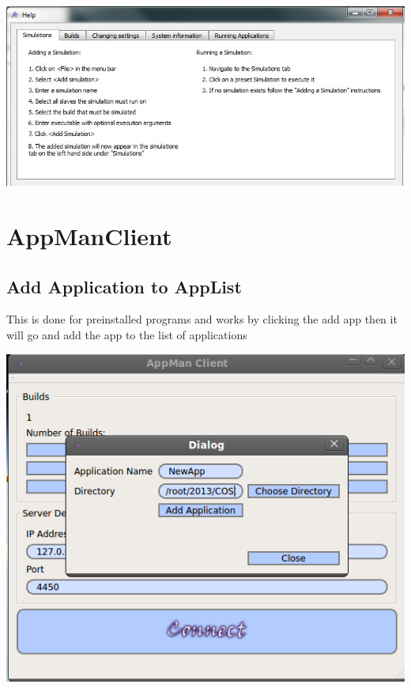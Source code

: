 \documentclass[a4paper,12pt,final]{article}
\begin{document}
\begin{center}
  	\includegraphics[scale=0.7]{AboutHelp.jpg}
 \end{center}

\newpage
\section{AppManClient}

\subsection{Add Application to AppList}
This is done for preinstalled programs and works by clicking the add app then it will go and add the app to the list of applications

\begin{center}
  	\includegraphics[scale=0.4]{AddAppToList.png}
 \end{center}
 
\end{document}
